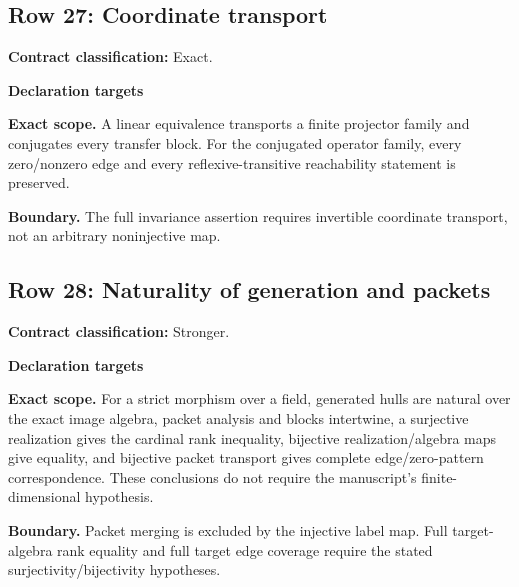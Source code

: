 \subsection{Row 27: Coordinate transport}
\label{row:27}
\textbf{Contract classification:} Exact.
\par\smallskip\textbf{Declaration targets}\par
{\small\noindent{}\par}
{\small\noindent{}\par}
{\small\noindent{}\par}
{\small\noindent{}\par}
\medskip\noindent\textbf{Exact scope.} A linear equivalence transports a finite projector family and conjugates every transfer block. For the conjugated operator family, every zero/nonzero edge and every reflexive-transitive reachability statement is preserved.
\par\smallskip\noindent\textbf{Boundary.} The full invariance assertion requires invertible coordinate transport, not an arbitrary noninjective map.
\medskip
\subsection{Row 28: Naturality of generation and packets}
\label{row:28}
\textbf{Contract classification:} Stronger.
\par\smallskip\textbf{Declaration targets}\par
{\small\noindent{}\par}
{\small\noindent{}\par}
{\small\noindent{}\par}
{\small\noindent{}\par}
{\small\noindent{}\par}
\medskip\noindent\textbf{Exact scope.} For a strict morphism over a field, generated hulls are natural over the exact image algebra, packet analysis and blocks intertwine, a surjective realization gives the cardinal rank inequality, bijective realization/algebra maps give equality, and bijective packet transport gives complete edge/zero-pattern correspondence. These conclusions do not require the manuscript's finite-dimensional hypothesis.
\par\smallskip\noindent\textbf{Boundary.} Packet merging is excluded by the injective label map. Full target-algebra rank equality and full target edge coverage require the stated surjectivity/bijectivity hypotheses.
\medskip
